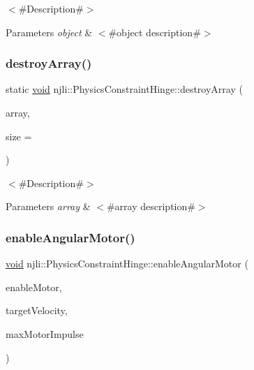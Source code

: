 $<$\#\+Description\#$>$


\begin{DoxyParams}{Parameters}
{\em object} & $<$\#object description\#$>$ \\
\hline
\end{DoxyParams}
\mbox{\label{classnjli_1_1_physics_constraint_hinge_a9f5b9ab458ef6a2551a7ede20b3c2d3d}} 
\subsubsection{\texorpdfstring{destroy\+Array()}{destroyArray()}}
{\footnotesize\ttfamily static \mbox{\hyperlink{_thread_8h_af1e856da2e658414cb2456cb6f7ebc66}{void}} njli\+::\+Physics\+Constraint\+Hinge\+::destroy\+Array (\begin{DoxyParamCaption}\item[{\mbox{\hyperlink{classnjli_1_1_physics_constraint_hinge}{Physics\+Constraint\+Hinge}} $\ast$$\ast$}]{array,  }\item[{const \mbox{\hyperlink{_util_8h_a10e94b422ef0c20dcdec20d31a1f5049}{u32}}}]{size = {} }\end{DoxyParamCaption})\hspace{0.3cm}{\ttfamily [static]}}

$<$\#\+Description\#$>$


\begin{DoxyParams}{Parameters}
{\em array} & $<$\#array description\#$>$ \\
\hline
\end{DoxyParams}
\mbox{\label{classnjli_1_1_physics_constraint_hinge_a3fb601299961f642b0b26ace87759e5d}} 
\subsubsection{\texorpdfstring{enable\+Angular\+Motor()}{enableAngularMotor()}}
{\footnotesize\ttfamily \mbox{\hyperlink{_thread_8h_af1e856da2e658414cb2456cb6f7ebc66}{void}} njli\+::\+Physics\+Constraint\+Hinge\+::enable\+Angular\+Motor (\begin{DoxyParamCaption}\item[{bool}]{enable\+Motor,  }\item[{\mbox{\hyperlink{_util_8h_a5f6906312a689f27d70e9d086649d3fd}{f32}}}]{target\+Velocity,  }\item[{\mbox{\hyperlink{_util_8h_a5f6906312a689f27d70e9d086649d3fd}{f32}}}]{max\+Motor\+Impulse }\end{DoxyParamCaption})}

